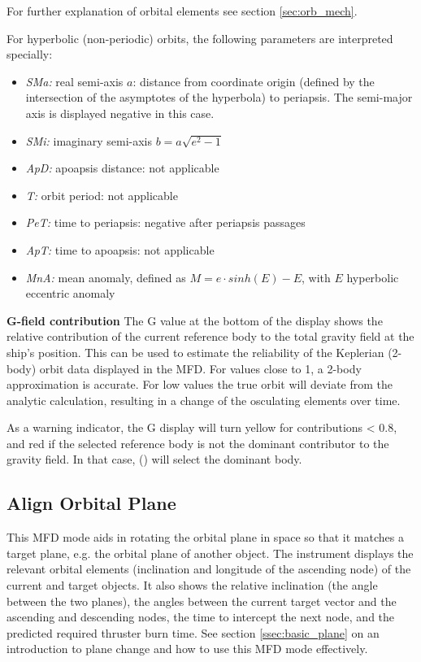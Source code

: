 \documentclass[Orbiter User Manual.tex]{subfiles}
\begin{document}
For further explanation of orbital elements see section \ref{sec:orb_mech}.

For hyperbolic (non-periodic) orbits, the following parameters are interpreted
specially:

\begin{itemize}
	\item \emph{SMa:} real semi-axis $a$: distance from coordinate origin
		(defined by the intersection of the asymptotes of the hyperbola) to
		periapsis. The semi-major axis is displayed negative in this case.
	\item \emph{SMi:} imaginary semi-axis $b = a \sqrt{e^{2} - 1}$
	\item \emph{ApD:} apoapsis distance: not applicable
	\item \emph{T:} orbit period: not applicable
	\item \emph{PeT:} time to periapsis: negative after periapsis passages
	\item \emph{ApT:} time to apoapsis: not applicable
	\item \emph{MnA:} mean anomaly, defined as $M = e \cdot sinh(E) - E$, with
		$E$ hyperbolic eccentric anomaly
\end{itemize}

\textbf{G-field contribution}
The G value at the bottom of the display shows the relative contribution of the
current reference body to the total gravity field at the ship's position. This
can be used to estimate the reliability of the Keplerian (2-body) orbit data
displayed in the MFD. For values close to 1, a 2-body approximation is accurate.
For low values the true orbit will deviate from the analytic calculation,
resulting in a change of the osculating elements over time.

As a warning indicator, the G display will turn yellow for contributions < 0.8,
and red if the selected reference body is not the dominant contributor to the
gravity field. In that case,  () will select the dominant
body.


\subsection{Align Orbital Plane}
\label{ssec:mfd_align}
This MFD mode aids in rotating the orbital plane in space so that it matches a
target plane, e.g. the orbital plane of another object. The instrument displays
the relevant orbital elements (inclination and longitude of the ascending node)
of the current and target objects. It also shows the relative inclination (the
angle between the two planes), the angles between the current target vector and
the ascending and descending nodes, the time to intercept the next node, and the
predicted required thruster burn time. See section \ref{ssec:basic_plane} on an
introduction to plane change and how to use this MFD mode effectively.
\end{document}
